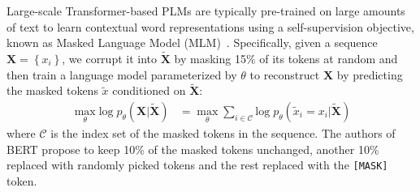 Large-scale Transformer-based PLMs 
are typically pre-trained on large amounts of text to learn contextual word representations using a self-supervision objective, known as Masked Language Model (MLM)~\citep{devlin2018bert}. %
Specifically, given a sequence $\bm{X}=\left\{x_i \right\}$, we corrupt it into $\bm{\tilde{X}}$ by masking 15\% of its tokens at random and then train a language model parameterized by $\theta$ to reconstruct $\bm{X}$ by predicting the masked tokens $\tilde{x}$ conditioned on $\bm{\tilde{X}}$: 
\begin{equation}
\label{mlm}
\begin{split}
       \max_{\theta} \text{log} \; p_{\theta}(\bm{X}|\bm{\tilde{X}}) &= \max_{\theta} \sum_{i\in \mathcal{C}}{\text{log} \;  p_{\theta}(\tilde{x}_i=x_i|\bm{\tilde{X}})} %
\end{split}
\end{equation}
where $\mathcal{C}$ is the index set of the masked tokens in the sequence. The authors of BERT propose to keep 10\% of the masked tokens unchanged, another 10\% replaced with randomly picked tokens and the rest replaced with the \texttt{[MASK]} token.


